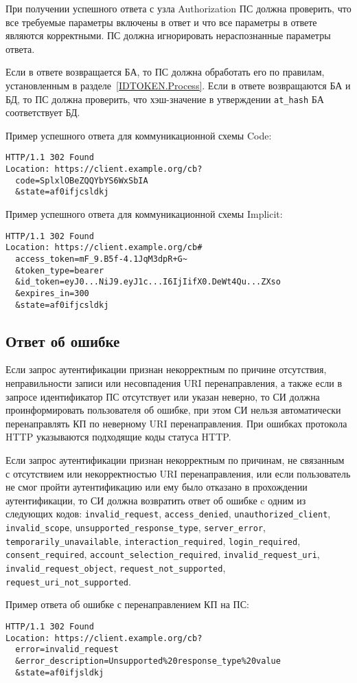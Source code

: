 При получении успешного ответа с узла Authorization ПС должна 
проверить, что все требуемые параметры включены в ответ
и что все параметры в ответе являются корректными.
%
ПС должна игнорировать нераспознанные параметры ответа.

Если в ответе возвращается БА, то ПС должна обработать его по правилам, 
установленным в разделе~\ref{IDTOKEN.Process}. 
%
Если в ответе возвращаются БА и БД, то ПС должна проверить, что хэш-значение
в утверждении \lstinline{at_hash} БА соответствует БД.

Пример успешного ответа для коммуникационной схемы Code:
%
\begin{lstlisting}
HTTP/1.1 302 Found
Location: https://client.example.org/cb?
  code=SplxlOBeZQQYbYS6WxSbIA
  &state=af0ifjcsldkj
\end{lstlisting}

Пример успешного ответа для коммуникационной схемы Implicit:
%
\begin{lstlisting}
HTTP/1.1 302 Found
Location: https://client.example.org/cb#
  access_token=mF_9.B5f-4.1JqM3dpR+G~
  &token_type=bearer
  &id_token=eyJ0...NiJ9.eyJ1c...I6IjIifX0.DeWt4Qu...ZXso
  &expires_in=300
  &state=af0ifjcsldkj
\end{lstlisting}

\subsection{Ответ об ошибке}\label{REQRESP.Auth.Error}

Если запрос аутентификации признан некорректным по причине отсутствия,
неправильности записи или несовпадения URI перенаправления, а также если в
запросе идентификатор ПС отсутствует или указан неверно, то СИ должна
проинформировать пользователя об ошибке, при этом СИ нельзя автоматически
перенаправлять КП по неверному URI перенаправления. При ошибках протокола HTTP
указываются подходящие коды статуса HTTP.

Если запрос аутентификации признан некорректным по причинам, не связанным с
отсутствием или некорректностью URI перенаправления, или если пользователь не
смог пройти аутентификацию или ему было отказано в прохождении аутентификации,
то СИ должна возвратить ответ об ошибке c одним из следующих кодов:
%
\lstinline{invalid_request}, 
\lstinline{access_denied},
\lstinline{unauthorized_client}, 
\lstinline{invalid_scope},
\lstinline{unsupported_response_type},
\lstinline{server_error}, 
\lstinline{temporarily_unavailable}, 
\lstinline{interaction_required},
\lstinline{login_required},
\lstinline{consent_required},
\lstinline{account_selection_required},
\lstinline{invalid_request_uri},
\lstinline{invalid_request_object},
\lstinline{request_not_supported}, 
\lstinline{request_uri_not_supported}. 

Пример ответа об ошибке с перенаправлением КП на ПС:
\begin{lstlisting}
HTTP/1.1 302 Found
Location: https://client.example.org/cb?
  error=invalid_request
  &error_description=Unsupported%20response_type%20value
  &state=af0ifjsldkj
\end{lstlisting}

